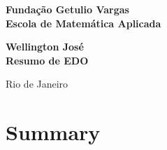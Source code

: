 \documentclass{article}
\begin{document}
\begin{titlepage}
\begin{center}
\textbf{\LARGE Fundação Getulio Vargas}\\ 
\textbf{\LARGE Escola de Matemática Aplicada}

\par
\vspace{170pt}
\textbf{\Large Wellington José}\\
\vspace{32pt}
\textbf{\Large Resumo de EDO}\\
\end{center}

\par
\vfill
\begin{center}
{{\normalsize Rio de Janeiro}\\
{\normalsize \the\year}}
\end{center}
\end{titlepage}

\section*{Summary}

\hspace{5mm}\textbf{}
\vspace{4mm}

\textbf{}
\vspace{4mm}

\textbf{}
\vspace{4mm}

\textbf{}
\vspace{4mm}

\textbf{}
\vspace{4mm}

\textbf{}
\vspace{4mm}

\textbf{}
\vspace{4mm}

\textbf{}
\vspace{4mm}

\textbf{}
\vspace{4mm}

\textbf{}
\vspace{4mm}

\textbf{}
\vspace{4mm}

\textbf{}
\vspace{4mm}
\end{document}
